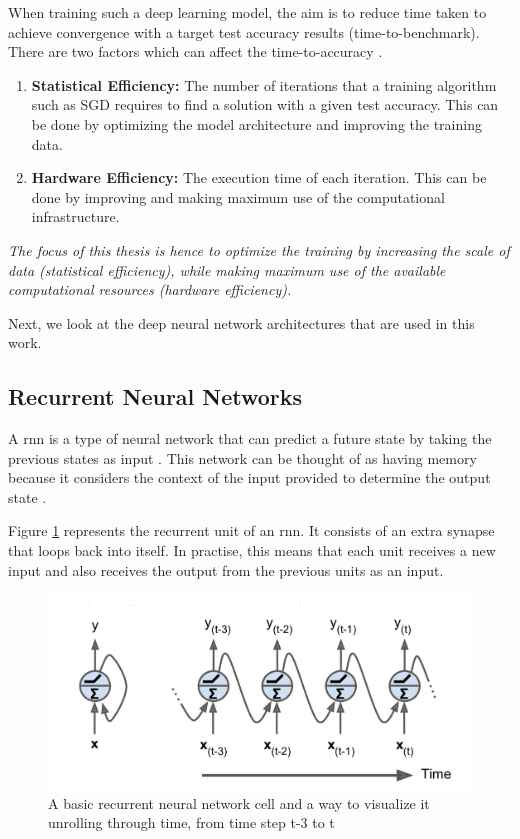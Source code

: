When training such a deep learning model, the aim is to reduce time taken to achieve convergence with a target test accuracy results (time-to-benchmark). There are two factors which can affect the time-to-accuracy \cite{Koliousis2019CROSSBOW:Servers}.
\begin{enumerate}
    \item \textbf{Statistical Efficiency:} The number of iterations that a training algorithm such as SGD requires to find a solution with a given test accuracy. This can be done by optimizing the model architecture and improving the training data.
    \item  \textbf{Hardware Efficiency:} The execution time of each iteration. This can be done by improving and making maximum use of the computational infrastructure. 
\end{enumerate}

\emph{The focus of this thesis is hence to optimize the training by increasing the scale of data (statistical efficiency), while making maximum use of the available computational resources (hardware efficiency).} 

Next, we look at the deep neural network architectures that are used in this work. 
\subsection {Recurrent Neural Networks}
A \acrfull{rnn} is a type of neural network that can predict a future state by taking the previous states as input \cite{Graves2013SpeechNetworks}. This network can be thought of as having memory because it considers the context of the input provided to determine the output state \cite{Hagner2017RecurrentModel}.

Figure \ref{fig:rnn} represents the recurrent unit of an \acrshort{rnn}. It consists of an extra synapse that loops back into itself. In practise, this means that each unit receives a new input and also receives the output from the previous units as an input.
\begin{figure}[ht]
  \begin{center}
    \includegraphics[width=\textwidth]{images/rnn.png} 
    \caption{A basic recurrent neural network cell and a way to visualize it
unrolling through time, from time step t-3 to t \cite{Hagner2017RecurrentModel}}
    \label{fig:rnn}
  \end{center}
\end{figure}

